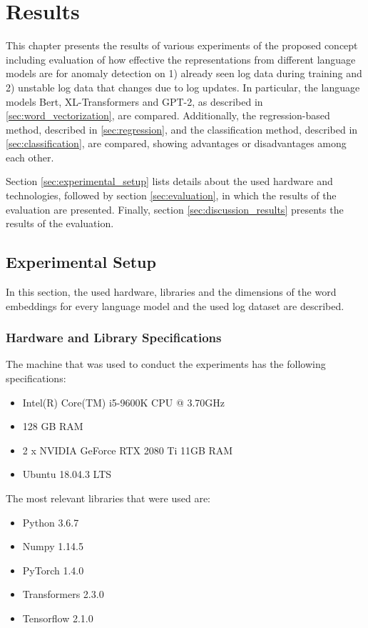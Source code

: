 \chapter{Results\label{cha:results}}
This chapter presents the results of various experiments of the proposed concept including evaluation of how effective the representations from different language models are for anomaly detection on 1) already seen log data during training and 2) unstable log data that changes due to log updates. In particular, the language models Bert, XL-Transformers and GPT-2, as described in \ref{sec:word_vectorization}, are compared. Additionally, the regression-based method, described in \ref{sec:regression}, and the classification method, described in \ref{sec:classification}, are compared, showing advantages or disadvantages among each other.

Section \ref{sec:experimental_setup} lists details about the used hardware and technologies, followed by section \ref{sec:evaluation}, in which the results of the evaluation are presented. Finally, section \ref{sec:discussion_results} presents the results of the evaluation.


\section{Experimental Setup\label{sec:experimental_setup}}
In this section, the used hardware, libraries and the dimensions of the word embeddings for every language model and the used log dataset are described.

\subsection{Hardware and Library Specifications}
The machine that was used to conduct the experiments has the following specifications:
\begin{itemize}
	\item Intel(R) Core(TM) i5-9600K CPU @ 3.70GHz
	\item 128 GB RAM
	\item 2 x NVIDIA GeForce RTX 2080 Ti 11GB RAM
	\item Ubuntu 18.04.3 LTS
\end{itemize}

\noindent The most relevant libraries that were used are:
\begin{itemize}
	\item Python 3.6.7
	\item Numpy 1.14.5
	\item PyTorch 1.4.0
	\item Transformers 2.3.0
	\item Tensorflow 2.1.0
\end{itemize}

